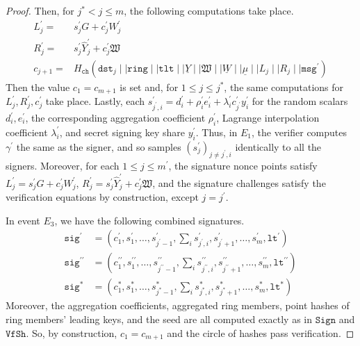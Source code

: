 \documentclass[11pt]{article}
\theoremstyle{definition}
\newcommand{\lt}{\texttt{lt}}
\newcommand{\tlt}{\texttt{tlt}}
\newcommand{\ring}{\texttt{ring}}
\newcommand{\sig}{\texttt{sig}}
\newcommand{\msg}{\texttt{msg}}
\newcommand{\sign}{\texttt{Sign}}
\newcommand{\verifyshare}{\texttt{VfSh}}
\begin{document}
\begin{proof}
Then, for $j^* < j \leq m$, the following computations take place.
\begin{align*}
L_j^\prime =& s_j^\prime G + c_j^\prime W_j^\prime \\
R_j^\prime =& s_j^\prime \widehat{Y}_j^\prime + c_j^\prime \mathfrak{W} \\
c_{j+1} =& H_{\texttt{ch}}(\texttt{dst}_{j} \mid \mid \ring \mid \mid \tlt \mid \mid \underline{\widehat{Y}} \mid \mid \mathfrak{W} \mid \mid \underline{W} \mid \mid \underline{\mu} \mid \mid L_{j} \mid \mid R_{j} \mid \mid \msg^\prime)
\end{align*}
Then the value $c_1 = c_{m+1}$ is set and, for $1 \leq j \leq j^*$, the same computations for $L_j^\prime, R_j^\prime, c_j^\prime$ take place. Lastly, each $s_{j^\prime, i}^\prime = d_i^\prime + \rho_i^\prime e_i^\prime + \lambda_i^\prime c_{j^\prime}^\prime y_i^\prime$ for the random scalars $d_i^\prime, e_i^\prime$, the corresponding aggregation coefficient $\rho_i^\prime$, Lagrange interpolation coefficient $\lambda_i^\prime$, and secret signing key share $y_i^\prime$.
Thus, in $E_1$, the verifier computes $\gamma^\prime$ the same as the signer, and so samples $(s_j^\prime)_{j\neq j^\prime,i}$ identically to all the signers. Moreover, for each $1 \leq j \leq m^\prime$, 
the signature nonce points satisfy $L_j^\prime = s_j^\prime G + c_j^\prime W_j^\prime$, $R_j^\prime = s_j^\prime \widehat{Y}_j^\prime + c_j^\prime \mathfrak{W}$, and the signature challenges satisfy the verification equations by construction, except $j=j^\prime$. 


In event $E_3$, we have the following combined signatures.
\begin{align*}
\sig^\prime &= (c_1^\prime, s_1^\prime, \ldots, s_{j^\prime - 1}^\prime, \sum_i s_{j^\prime, i}^\prime, s_{j^\prime + 1}^\prime, \ldots, s_m^\prime, \lt^\prime) \\
\sig^{\prime \prime} &= (c_1^{\prime \prime}, s_1^{\prime \prime}, \ldots, s_{j^{\prime \prime} - 1}^{\prime \prime}, \sum_i s_{j^{\prime \prime}, i}^{\prime \prime}, s_{j^{\prime \prime} + 1}^{\prime \prime}, \ldots, s_m^{\prime \prime}, \lt^{\prime \prime}) \\
\sig^* &= (c_1^*, s_1^*, \ldots, s_{j^* - 1}^*, \sum_i s_{j^*, i}^*, s_{j^* + 1}^*, \ldots, s_m^*, \lt^*) 
\end{align*}
Moreover, the aggregation coefficients, aggregated ring members, point hashes of ring members' leading keys, and the seed are all computed exactly as in $\sign$ and $\verifyshare$. So, by construction, $c_1 = c_{m+1}$ and the circle of hashes pass verification.


\end{proof}
\end{document}
